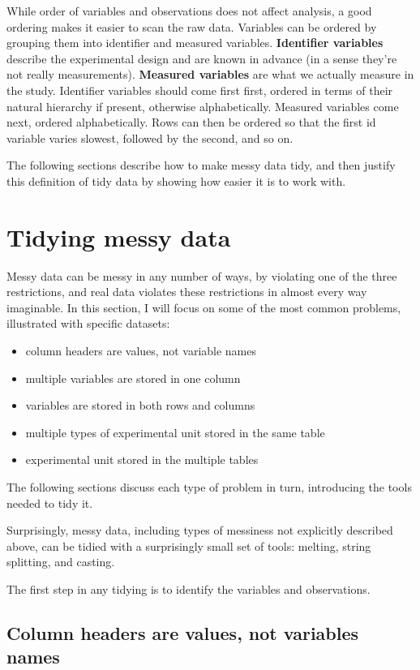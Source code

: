 \documentclass[oneside]{article}
\begin{document}
While order of variables and observations does not affect analysis, a good ordering makes it easier to scan the raw data. Variables can be ordered by grouping them into identifier and measured variables. \textbf{Identifier variables} describe the experimental design and are known in advance (in a sense they're not really measurements). \textbf{Measured variables} are what we actually measure in the study. Identifier variables should come first first, ordered in terms of their natural hierarchy if present, otherwise alphabetically. Measured variables come next, ordered alphabetically. Rows can then be ordered so that the first id variable varies slowest, followed by the second, and so on.

The following sections describe how to make messy data tidy, and then justify this definition of tidy data by showing how easier it is to work with.

\section{Tidying messy data}

Messy data can be messy in any number of ways, by violating one of the three restrictions, and real data violates these restrictions in almost every way imaginable. In this section, I will focus on some of the most common problems, illustrated with specific datasets:

\begin{itemize}
  \item column headers are values, not variable names
  \item multiple variables are stored in one column
  \item variables are stored in both rows and columns
  \item multiple types of experimental unit stored in the same table
  \item experimental unit stored in the multiple tables
\end{itemize}

The following sections discuss each type of problem in turn, introducing the tools needed to tidy it.

Surprisingly, messy data, including types of messiness not explicitly described above, can be tidied with a surprisingly small set of tools: melting, string splitting, and casting. 

The first step in any tidying is to identify the variables and observations. 

\subsection{Column headers are values, not variables names}
\end{document}
